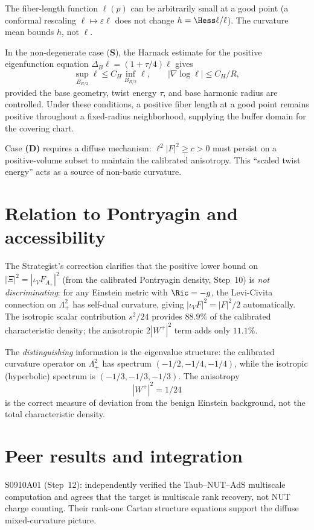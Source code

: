 The fiber-length function $\ell(p)$ can be arbitrarily small at a good
point (a conformal rescaling $\ell\mapsto\varepsilon\ell$ does not change
$h=\Hess\ell/\ell$).  The curvature mean bounds $h$, not $\ell$.

In the non-degenerate case (\textbf{S}), the Harnack estimate for the
positive eigenfunction equation $\Delta_B\ell=(1+\tau/4)\ell$ gives
\[
 \sup_{B_{R/2}}\ell\le C_H\inf_{B_{R/2}}\ell,\qquad
 |\nabla\log\ell|\le C_H/R,
\]
provided the base geometry, twist energy $\tau$, and base harmonic
radius are controlled.  Under these conditions, a positive fiber length
at a good point remains positive throughout a fixed-radius neighborhood,
supplying the buffer domain for the covering chart.

Case \textbf{(D)} requires a diffuse mechanism:
$\ell^2|F|^2\ge c>0$ must persist on a positive-volume subset to maintain
the calibrated anisotropy.  This ``scaled twist energy'' acts as a source
of non-basic curvature.

\section{Relation to Pontryagin and accessibility}

The Strategist's correction clarifies that the positive lower bound on
$|\Xi|^2=|\iota_VF_{A_+}|^2$ (from the calibrated Pontryagin density,
Step~10) is \emph{not discriminating}: for any Einstein metric with
$\Ric=-g$, the Levi-Civita connection on $\Lambda^2_+$ has self-dual
curvature, giving $|\iota_VF|^2=|F|^2/2$ automatically.  The isotropic
scalar contribution $s^2/24$ provides $88.9\%$ of the calibrated
characteristic density; the anisotropic $2|W^+|^2$ term adds only
$11.1\%$.

The \emph{distinguishing} information is the eigenvalue structure:
the calibrated curvature operator on $\Lambda^2_+$ has spectrum
$(-1/2,-1/4,-1/4)$, while the isotropic (hyperbolic) spectrum is
$(-1/3,-1/3,-1/3)$.  The anisotropy
\[
 |W^+|^2=1/24
\]
is the correct measure of deviation from the benign Einstein background,
not the total characteristic density.

\section{Peer results and integration}

S0910A01 (Step~12): independently verified the Taub--NUT--AdS multiscale
computation and agrees that the target is multiscale rank recovery, not
NUT charge counting.  Their rank-one Cartan structure equations support
the diffuse mixed-curvature picture.

